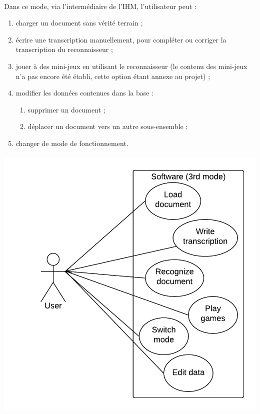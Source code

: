 \paragraph{}
Dans ce mode, via l'intermédiaire de l’IHM, l’utilisateur peut :
\begin{enumerate}
\item charger un document sans vérité terrain ;
\item écrire une transcription manuellement, pour compléter ou corriger la
transcription du reconnaisseur ;
\item jouer à des mini-jeux en utilisant le reconnaisseur (le contenu des
mini-jeux n’a pas encore été établi, cette option étant annexe au projet) ;
\item modifier les données contenues dans la base :
\begin{enumerate}
\item supprimer un document ;
\item déplacer un document vers un autre sous-ensemble ;
\end{enumerate}
\item changer de mode de fonctionnement.
\end{enumerate}

\paragraph{}
\begin{mdframed}[frametitle={Figure 4 : Diagramme de cas d'utilisation (mode production)}, innerbottommargin=10]
\begin{center}
\includegraphics[scale=0.6]{Usecase_3.png}
\end{center}
\end{mdframed}


